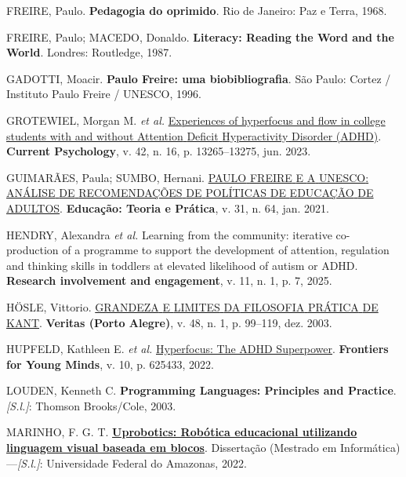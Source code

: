 \documentclass[
  12pt,
  a4paper,
]{article}
\newlength{\cslhangindent}
\newlength{\cslentryspacingunit} %
\newenvironment{CSLReferences}[2] %
 {%
  \setlength{\parindent}{0pt}
  \ifodd #1
  \let\oldpar\par
  \def\par{\hangindent=\cslhangindent\oldpar}
  \fi
  \setlength{\parskip}{#2\cslentryspacingunit}
 }%
 {}
\begin{document}
\begin{CSLReferences}{0}{1}
\leavevmode{}%
FREIRE, Paulo. \textbf{Pedagogia do oprimido}. Rio de Janeiro: Paz e
Terra, 1968.

\leavevmode{}%
FREIRE, Paulo; MACEDO, Donaldo. \textbf{Literacy: Reading the Word and
the World}. Londres: Routledge, 1987.

\leavevmode{}%
GADOTTI, Moacir. \textbf{Paulo Freire: uma biobibliografia}. São Paulo:
Cortez / Instituto Paulo Freire / UNESCO, 1996.

\leavevmode{}%
GROTEWIEL, Morgan M. \emph{et al.}
\href{https://doi.org/10.1007/s12144-021-02539-0}{Experiences of
hyperfocus and flow in college students with and without {Attention}
{Deficit} {Hyperactivity} {Disorder} ({ADHD})}. \textbf{Current
Psychology}, v. 42, n. 16, p. 13265--13275, jun. 2023.

\leavevmode{}%
GUIMARÃES, Paula; SUMBO, Hernani.
\href{https://doi.org/10.18675/1981-8106.v31.n.64.s16188}{{PAULO}
{FREIRE} {E} {A} {UNESCO}: {ANÁLISE} {DE} {RECOMENDAÇÕES} {DE}
{POLÍTICAS} {DE} {EDUCAÇÃO} {DE} {ADULTOS}}. \textbf{Educação: Teoria e
Prática}, v. 31, n. 64, jan. 2021.

\leavevmode{}%
HENDRY, Alexandra \emph{et al.} Learning from the community: iterative
co-production of a programme to support the development of attention,
regulation and thinking skills in toddlers at elevated likelihood of
autism or {ADHD}. \textbf{Research involvement and engagement}, v. 11,
n. 1, p. 7, 2025.

\leavevmode{}%
HÖSLE, Vittorio.
\href{https://doi.org/10.15448/1984-6746.2003.1.34779}{{GRANDEZA} {E}
{LIMITES} {DA} {FILOSOFIA} {PRÁTICA} {DE} {KANT}}. \textbf{Veritas
(Porto Alegre)}, v. 48, n. 1, p. 99--119, dez. 2003.

\leavevmode{}%
HUPFELD, Kathleen E. \emph{et al.}
\href{https://doi.org/10.3389/frym.2021.625433}{Hyperfocus: The ADHD
Superpower}. \textbf{Frontiers for Young Minds}, v. 10, p. 625433, 2022.

\leavevmode{}%
LOUDEN, Kenneth C. \textbf{Programming Languages: Principles and
Practice}. \emph{{[}S.l.{]}}: Thomson Brooks/Cole, 2003.

\leavevmode{}%
MARINHO, F. G. T.
\textbf{\href{https://tede.ufam.edu.br/handle/tede/8809}{Uprobotics:
Robótica educacional utilizando linguagem visual baseada em blocos}}.
Dissertação (Mestrado em Informática)---\emph{{[}S.l.{]}}: Universidade
Federal do Amazonas, 2022.


\end{CSLReferences}
\end{document}
